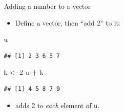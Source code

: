 \documentclass[
  ignorenonframetext,
]{beamer}
\newenvironment{Shaded}{\begin{snugshade}}{\end{snugshade}}
\newcommand{\DecValTok}[1]{\textcolor[rgb]{0.00,0.00,0.81}{#1}}
\newcommand{\NormalTok}[1]{#1}
\newcommand{\OperatorTok}[1]{\textcolor[rgb]{0.81,0.36,0.00}{\textbf{#1}}}
\newcommand{\StringTok}[1]{\textcolor[rgb]{0.31,0.60,0.02}{#1}}
\providecommand{\tightlist}{%
  \setlength{\itemsep}{0pt}\setlength{\parskip}{0pt}}
\begin{document}
\begin{frame}[fragile]{Adding a number to a vector}
\protect\hypertarget{adding-a-number-to-a-vector}{}

\begin{itemize}
\tightlist
\item
  Define a vector, then ``add 2'' to it:
\end{itemize}

\begin{Shaded}
\begin{Highlighting}[]
\NormalTok{u}
\end{Highlighting}
\end{Shaded}

\begin{verbatim}
## [1] 2 3 6 5 7
\end{verbatim}

\begin{Shaded}
\begin{Highlighting}[]
\NormalTok{k <-}\StringTok{ }\DecValTok{2}
\NormalTok{u }\OperatorTok{+}\StringTok{ }\NormalTok{k}
\end{Highlighting}
\end{Shaded}

\begin{verbatim}
## [1] 4 5 8 7 9
\end{verbatim}

\begin{itemize}
\tightlist
\item
  adds 2 to \emph{each} element of \texttt{u}.
\end{itemize}

\end{frame}
\end{document}
